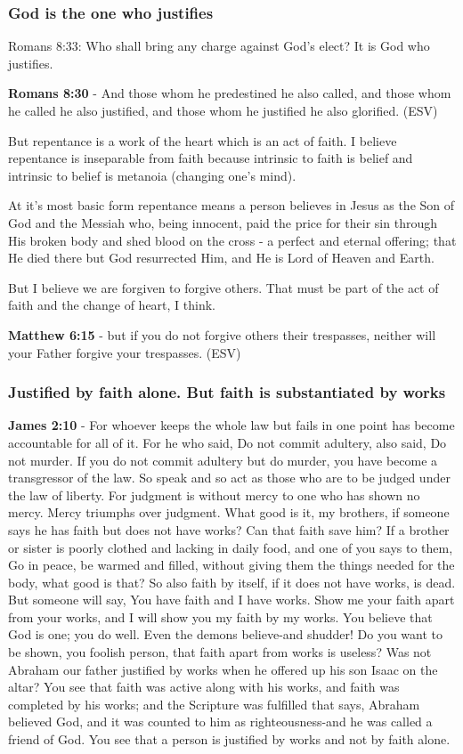 \documentclass[11pt]{article}
\begin{document}
\subsubsection{God is the one who justifies}
\label{sec:orgcdf24f8}

Romans 8:33: Who shall bring any charge against God's elect? It is God who justifies.

\textbf{Romans 8:30} - And those whom he predestined he also called, and those whom he called he also justified, and those whom he justified he also glorified. (ESV)

But repentance is a work of the heart which is an act of faith.
I believe repentance is inseparable from faith because intrinsic to faith is belief and intrinsic to belief is metanoia (changing one's mind).

At it's most basic form repentance means a person believes in Jesus as the Son of God and the Messiah who, being innocent, paid the price for their sin through His broken body and shed blood on the cross - a perfect and eternal offering; that He died there but God resurrected Him, and He is Lord of Heaven and Earth.

But I believe we are forgiven to forgive others. That must be part of the act of faith and the change of heart, I think.

\textbf{Matthew 6:15} - but if you do not forgive others their trespasses, neither will your Father forgive your trespasses.  (ESV)

\subsubsection{Justified by faith alone. But faith is substantiated by works}
\label{sec:orga8a4862}
\textbf{James 2:10} - For whoever keeps the whole law but fails in one point has become accountable for all of it.  For he who said, Do not commit adultery, also said, Do not murder. If you do not commit adultery but do murder, you have become a transgressor of the law.  So speak and so act as those who are to be judged under the law of liberty.  For judgment is without mercy to one who has shown no mercy. Mercy triumphs over judgment.  What good is it, my brothers, if someone says he has faith but does not have works? Can that faith save him?  If a brother or sister is poorly clothed and lacking in daily food, and one of you says to them, Go in peace, be warmed and filled, without giving them the things needed for the body, what good is that?  So also faith by itself, if it does not have works, is dead.  But someone will say, You have faith and I have works. Show me your faith apart from your works, and I will show you my faith by my works.  You believe that God is one; you do well. Even the demons believe-and shudder!  Do you want to be shown, you foolish person, that faith apart from works is useless?  Was not Abraham our father justified by works when he offered up his son Isaac on the altar?  You see that faith was active along with his works, and faith was completed by his works; and the Scripture was fulfilled that says, Abraham believed God, and it was counted to him as righteousness-and he was called a friend of God.  You see that a person is justified by works and not by faith alone.
\end{document}
